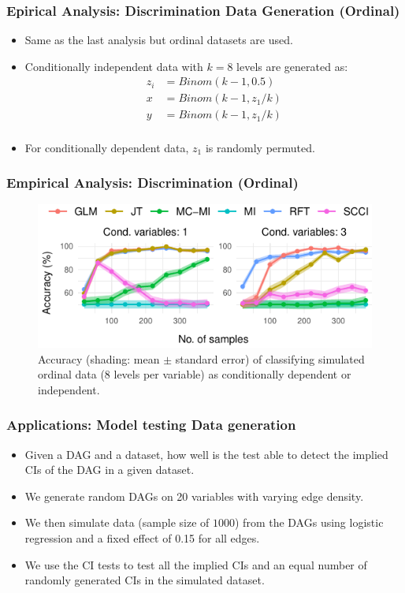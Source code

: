\documentclass{beamer}
\begin{document}
\begin{frame}
	\frametitle{Epirical Analysis: Discrimination Data Generation (Ordinal)}
	\begin{itemize}
		\item Same as the last analysis but ordinal datasets are used.
		\item Conditionally independent data with $ k = 8 $ levels are generated as:
			\begin{equation*}
				\begin{split}
					z_i &= \textit{Binom}(k-1, 0.5) \\
					x &= \textit{Binom}(k-1, z_1/k) \\
					y &= \textit{Binom}(k-1, z_1/k) \\
				\end{split}
			\end{equation*}
		\item For conditionally dependent data, $ z_1 $ is randomly permuted.
	\end{itemize}
\end{frame}

\begin{frame}
	\frametitle{Empirical Analysis: Discrimination (Ordinal)}
	\begin{figure}
		\centering
		\includegraphics{imgs/accuracy_ordinal.pdf}
		\caption*{Accuracy (shading: mean $\pm$ standard error) of
		classifying simulated ordinal data (8 levels per variable) as
		conditionally dependent or independent.}	
	\end{figure}
\end{frame}

\begin{frame}
	\frametitle{Applications: Model testing Data generation}
	\begin{itemize}
		\item Given a DAG and a dataset, how well is the test able to
			detect the implied CIs of the DAG in a given dataset.
		\item We generate random DAGs on 20 variables with varying edge density.
		\item We then simulate data (sample size of $1000 $) from the
			DAGs using logistic regression and a fixed effect of
			0.15 for all edges.
		\item We use the CI tests to test all the implied CIs and an equal number of 
			randomly generated CIs in the simulated dataset.
	\end{itemize}
\end{frame}
\end{document}
